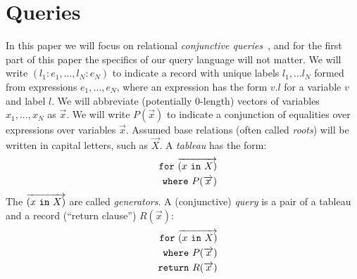 \documentclass[preprint]{sigplanconf}
\newcommand{\FOR}{{\tt for} \ }
\newcommand{\WHERE}{{\tt where} \ }
\newcommand{\IN}{ \ {\tt in} \ }
\newcommand{\RETURN}{{\tt return} \ }
\begin{document}
\section{Queries}

In this paper we will focus on relational {\it conjunctive queries}~\cite{foundations}, and for the first part of this paper the specifics of our query language will not matter.   We will write $(l_1: e_1, \ldots, l_N: e_N)$ to indicate a record with unique labels $l_1, \ldots l_N$ formed from expressions $e_1, \ldots, e_N$, where an expression has the form $v.l$ for a variable $v$ and label $l$.  We will abbreviate (potentially 0-length) vectors of variables $x_1,...,x_N$ as $\overrightarrow{x}$.  We will write $P(\overrightarrow{x})$ to indicate a conjunction of equalities over expressions over variables $\overrightarrow{x}$.  Assumed base relations (often called {\it roots}) will be written in capital letters, such as $\overrightarrow{X}$.  A {\it tableau} has the form:
\begin{eqnarray*}
 & & \FOR \overrightarrow{(x \IN X)} \\
 & & \WHERE P(\overrightarrow{x})
\end{eqnarray*}
The $\overrightarrow{(x \IN X)}$ are called {\it generators}.  A (conjunctive) {\it query} is a pair of a  tableau and a record (``return clause'') $R(\overrightarrow{x})$:
\begin{eqnarray*}
 & & \FOR \overrightarrow{(x \IN X)} \\
& & \WHERE  P(\overrightarrow{x}) \\ 
 & & \RETURN R(\overrightarrow{x})
\end{eqnarray*}
\end{document}
